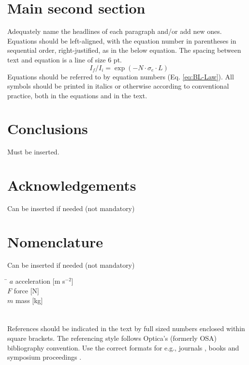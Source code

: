 \documentclass[fleqn]{ILASSEurope_2026_Paper_Format}
\begin{document}
\bigskip
\section{Main second section}
Adequately name the headlines of each paragraph and/or add new ones. Equations should be left-aligned, with the equation number in parentheses in sequential order, right-justified, as in the below equation. The spacing between text and equation is a line of size 6 pt.
\begin{equation}\label{eq:BL-Law}
I_f/I_i = \exp(-N\cdot\sigma_e\cdot L)
\end{equation}
Equations should be referred to by equation numbers (Eq. \ref{eq:BL-Law}). All symbols should be printed in italics or otherwise according to conventional practice, both in the equations and in the text. 


\vspace{5mm}
\section*{Conclusions}
Must be inserted.
\vspace{5mm}
\section*{Acknowledgements}
Can be inserted if needed (not mandatory)
\vspace{5mm}
\section*{Nomenclature}
Can be inserted if needed (not mandatory)
\begin{tabbing}
\hspace*{1.18 cm}  \= \hspace*{4 cm}  \kill
$a$ \> acceleration [m s$^{-2}$]    \\
$F$ \> force [N]\\
$m$ \> mass [kg]
\end{tabbing}

\section*{}
References should be indicated in the text by full sized numbers enclosed within square brackets. The referencing style follows Optica's (formerly OSA) bibliography convention. Use the correct formats for e.g., journals \cite{Roth:22}, books \cite{LEFEBVRE2017} and symposium proceedings \cite{Lampa:11}. 




\end{document}
